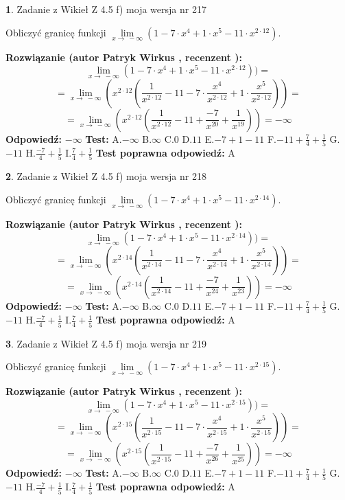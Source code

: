 \documentclass[12pt, a4paper]{article}
\theoremstyle{definition} %
\newtheorem{zad}{}
\newcommand{\zadStart}[1]{\begin{zad}#1\newline}
\newcommand{\zadStop}{\end{zad}}
\newcommand{\rozwStart}[2]{\noindent \textbf{Rozwiązanie (autor #1 , recenzent #2): }\newline}
\newcommand{\rozwStop}{\newline}
\newcommand{\odpStart}{\noindent \textbf{Odpowiedź:}\newline}
\newcommand{\odpStop}{\newline}
\newcommand{\testStart}{\noindent \textbf{Test:}\newline}
\newcommand{\testStop}{\newline}
\newcommand{\kluczStart}{\noindent \textbf{Test poprawna odpowiedź:}\newline}
\newcommand{\kluczStop}{\newline}
\begin{document}
\zadStart{Zadanie z Wikieł Z 4.5 f) moja wersja nr 217}



Obliczyć granicę funkcji  $\lim\limits_{x\to\ -\infty}(1 - 7 \cdot x^{4}+1 \cdot x^{5}- 11 \cdot x^{2\cdot12})$.
\zadStop
\rozwStart{Patryk Wirkus}{}
$$\lim\limits_{x\to\ -\infty}(1 - 7 \cdot x^{4}+1 \cdot x^{5}- 11 \cdot x^{2\cdot12}))=$$
$$=\lim\limits_{x\to\ -\infty}(x^{2\cdot12}(\frac{1}{x^{2\cdot12}}-11 -7 \cdot \frac{x^{4}}{x^{2\cdot12}}+1 \cdot \frac{x^{5}}{x^{2\cdot12}}))=$$
$$=\lim\limits_{x\to\ -\infty}(x^{2\cdot12}(\frac{1}{x^{2\cdot12}}-11 + \frac{-7}{x^{20}}+ \frac{1}{x^{19}}))=-\infty$$
\rozwStop
\odpStart
$-\infty$
\odpStop
\testStart
A.$-\infty$ B.$\infty$ C.$0$ D.$11$ E.$-7 + 1 - 11$
F.$-11+\frac{7}{4}+\frac{1}{5}$ G.$-11$
H.$\frac{-7}{4}+\frac{1}{5}$
I.$\frac{7}{4}+\frac{1}{5}$
\testStop
\kluczStart
A
\kluczStop



\zadStart{Zadanie z Wikieł Z 4.5 f) moja wersja nr 218}



Obliczyć granicę funkcji  $\lim\limits_{x\to\ -\infty}(1 - 7 \cdot x^{4}+1 \cdot x^{5}- 11 \cdot x^{2\cdot14})$.
\zadStop
\rozwStart{Patryk Wirkus}{}
$$\lim\limits_{x\to\ -\infty}(1 - 7 \cdot x^{4}+1 \cdot x^{5}- 11 \cdot x^{2\cdot14}))=$$
$$=\lim\limits_{x\to\ -\infty}(x^{2\cdot14}(\frac{1}{x^{2\cdot14}}-11 -7 \cdot \frac{x^{4}}{x^{2\cdot14}}+1 \cdot \frac{x^{5}}{x^{2\cdot14}}))=$$
$$=\lim\limits_{x\to\ -\infty}(x^{2\cdot14}(\frac{1}{x^{2\cdot14}}-11 + \frac{-7}{x^{24}}+ \frac{1}{x^{23}}))=-\infty$$
\rozwStop
\odpStart
$-\infty$
\odpStop
\testStart
A.$-\infty$ B.$\infty$ C.$0$ D.$11$ E.$-7 + 1 - 11$
F.$-11+\frac{7}{4}+\frac{1}{5}$ G.$-11$
H.$\frac{-7}{4}+\frac{1}{5}$
I.$\frac{7}{4}+\frac{1}{5}$
\testStop
\kluczStart
A
\kluczStop



\zadStart{Zadanie z Wikieł Z 4.5 f) moja wersja nr 219}



Obliczyć granicę funkcji  $\lim\limits_{x\to\ -\infty}(1 - 7 \cdot x^{4}+1 \cdot x^{5}- 11 \cdot x^{2\cdot15})$.
\zadStop
\rozwStart{Patryk Wirkus}{}
$$\lim\limits_{x\to\ -\infty}(1 - 7 \cdot x^{4}+1 \cdot x^{5}- 11 \cdot x^{2\cdot15}))=$$
$$=\lim\limits_{x\to\ -\infty}(x^{2\cdot15}(\frac{1}{x^{2\cdot15}}-11 -7 \cdot \frac{x^{4}}{x^{2\cdot15}}+1 \cdot \frac{x^{5}}{x^{2\cdot15}}))=$$
$$=\lim\limits_{x\to\ -\infty}(x^{2\cdot15}(\frac{1}{x^{2\cdot15}}-11 + \frac{-7}{x^{26}}+ \frac{1}{x^{25}}))=-\infty$$
\rozwStop
\odpStart
$-\infty$
\odpStop
\testStart
A.$-\infty$ B.$\infty$ C.$0$ D.$11$ E.$-7 + 1 - 11$
F.$-11+\frac{7}{4}+\frac{1}{5}$ G.$-11$
H.$\frac{-7}{4}+\frac{1}{5}$
I.$\frac{7}{4}+\frac{1}{5}$
\testStop
\kluczStart
A
\kluczStop
\end{document}
